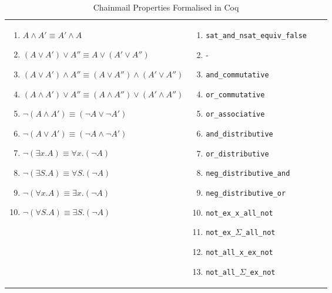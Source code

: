 \begin{table}
\begin{tabular}{|l|l|l|l|}
{\begin{enumerate}[label={(\arabic*)}]
            \item $A \wedge A' \equiv A' \wedge A$
            \item $(A \vee A') \vee A'' \equiv A \vee (A' \vee A'')$
            \item $(A \vee A') \wedge A'' \equiv (A \vee A'') \wedge (A' \vee A'')$
            \item $(A \wedge A') \vee A'' \equiv (A \wedge A'') \vee (A' \wedge A'')$
            \item $\neg (A \wedge A') \equiv (\neg A \vee \neg A')$
            \item $\neg (A \vee A') \equiv (\neg A \wedge \neg A')$
            \item $\neg (\exists x.A) \equiv \forall x. (\neg A)$
            \item $\neg (\exists S.A) \equiv \forall S. (\neg A)$
            \item $\neg (\forall x.A) \equiv \exists x. (\neg A)$
            \item $\neg (\forall S.A) \equiv \exists S. (\neg A)$
        \end{enumerate}}
        & 
\parbox{.35\textwidth}{\scriptsize\begin{enumerate}[label={(\arabic*)}]
            \item \texttt{sat\_and\_nsat\_equiv\_false}
            \item -
            \item \texttt{and\_commutative}
            \item \texttt{or\_commutative}
            \item \texttt{or\_associative}
            \item \texttt{and\_distributive}
            \item \texttt{or\_distributive}
            \item \texttt{neg\_distributive\_and}
            \item \texttt{neg\_distributive\_or}
            \item \texttt{not\_ex\_x\_all\_not}
            \item \texttt{not\_ex\_$\Sigma$\_all\_not}
            \item \texttt{not\_all\_x\_ex\_not}
            \item \texttt{not\_all\_$\Sigma$\_ex\_not}
        \end{enumerate}}
\\
\hline
  \end{tabular}
  \caption{Chainmail Properties Formalised in Coq}
  \label{tab:Coq:properties}
\end{table}